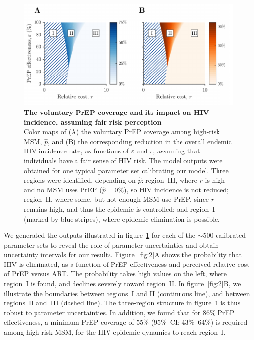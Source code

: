 \documentclass[preprint,review,12pt]{article}			%
\begin{document}
\begin{figure}[H] 
	\centering	
	\includegraphics{Figures/Fig_1}
	\caption{{\bf The voluntary PrEP coverage and its impact on HIV incidence, assuming fair risk perception} \\
	Color maps of (A) the voluntary PrEP coverage among high-risk MSM, $\hat{p}$, and (B) the corresponding reduction in the overall endemic HIV incidence rate, as functions of $\varepsilon$ and $r$, assuming that individuals have a fair sense of HIV risk. The model outputs were obtained for one typical parameter set calibrating our model. Three regions were identified, depending on $\hat{p}$: region~III, where $r$ is high and no MSM uses PrEP ($\hat{p}=0\%$), so HIV incidence is not reduced; region~II, where some, but not enough MSM use PrEP, since $r$ remains high, and thus the epidemic is controlled; and region~I (marked by blue stripes), where epidemic elimination is possible.}
	\label{fig:1}
\end{figure}

We generated the outputs illustrated in figure~\ref{fig:1} for each of the $\sim500$ calibrated parameter sets to reveal the role of parameter uncertainties and obtain uncertainty intervals for our results. Figure~\ref{fig:2}A shows the probability that HIV is eliminated, as a function of PrEP effectiveness and perceived relative cost of PrEP versus ART. The probability takes high values on the left, where region~I is found, and declines severely toward region~II. In figure~\ref{fig:2}B, we illustrate the boundaries between regions~I and II (continuous line), and between regions~II and~III (dashed line). The three-region structure in figure~\ref{fig:1} is thus robust to parameter uncertainties. In addition, we found that for $86\%$ PrEP effectiveness, a minimum PrEP coverage of $55\%$ (95\%~CI: $43\%$--$64\%$) is required among high-risk MSM, for the HIV epidemic dynamics to reach region~I.
\end{document}
